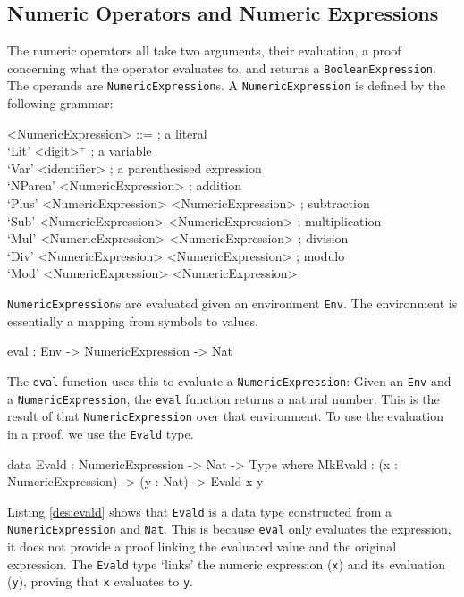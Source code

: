     \subsection{Numeric Operators and Numeric Expressions}
        The numeric operators all take two arguments, their evaluation, a proof concerning what the operator evaluates to, and returns a \texttt{BooleanExpression}.
        The operands are \texttt{NumericExpression}s. A \texttt{NumericExpression} is defined by the following grammar:
        \setlength{\grammarindent}{12em}
        \begin{grammar}
            <NumericExpression>
            ::=  ; a literal\\
                 `Lit' <digit>$^+$
            \alt ; a variable\\
                 `Var' <identifier>
            \alt ; a parenthesised expression\\
                 `NParen' <NumericExpression>
            \alt ; addition\\
                 `Plus' <NumericExpression> <NumericExpression>
            \alt ; subtraction\\
                 `Sub' <NumericExpression> <NumericExpression>
            \alt ; multiplication\\
                 `Mul' <NumericExpression> <NumericExpression>
            \alt ; division\\
                 `Div' <NumericExpression> <NumericExpression>
            \alt ; modulo\\
                 `Mod' <NumericExpression> <NumericExpression>
        \end{grammar}
        \texttt{NumericExpression}s are evaluated given an environment \texttt{Env}. The environment is essentially a mapping from symbols to values.
        \begin{code}[caption={The type of the \texttt{eval} function}]
            eval : Env -> NumericExpression -> Nat
        \end{code}
        The \texttt{eval} function uses this to evaluate a \texttt{NumericExpression}: Given an \texttt{Env} and a \texttt{NumericExpression}, the \texttt{eval} function returns a natural number. This is the result of that \texttt{NumericExpression} over that environment. To use the evaluation in a proof, we use the \texttt{Evald} type.
        \begin{code}[caption={\texttt{Evald} as defined in the \textsc{TeamPlay} CSL},label={des:evald}]
    data Evald : NumericExpression -> Nat -> Type where
        MkEvald : (x : NumericExpression) -> (y : Nat) -> Evald x y
        \end{code}
        Listing \ref{des:evald} shows that \texttt{Evald} is a data type constructed from a \texttt{NumericExpression} and \texttt{Nat}. This  is because \texttt{eval} only evaluates the expression, it does not provide a proof linking the evaluated value and the original expression. The \texttt{Evald} type `links' the numeric expression (\texttt{x}) and its evaluation (\texttt{y}), proving that \texttt{x} evaluates to \texttt{y}.
        \\
        
